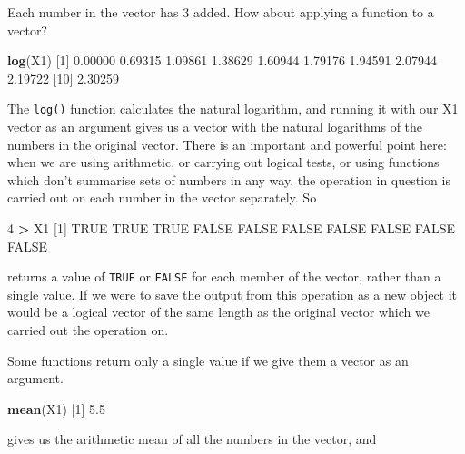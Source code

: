 \documentclass[
]{book}
\newenvironment{Shaded}{\begin{snugshade}}{\end{snugshade}}
\newcommand{\DecValTok}[1]{\textcolor[rgb]{0.00,0.00,0.81}{#1}}
\newcommand{\FloatTok}[1]{\textcolor[rgb]{0.00,0.00,0.81}{#1}}
\newcommand{\KeywordTok}[1]{\textcolor[rgb]{0.13,0.29,0.53}{\textbf{#1}}}
\newcommand{\NormalTok}[1]{#1}
\newcommand{\OperatorTok}[1]{\textcolor[rgb]{0.81,0.36,0.00}{\textbf{#1}}}
\newcommand{\OtherTok}[1]{\textcolor[rgb]{0.56,0.35,0.01}{#1}}
\newcommand{\StringTok}[1]{\textcolor[rgb]{0.31,0.60,0.02}{#1}}
\begin{document}
Each number in the vector has 3 added. How about applying a function to a vector?

\begin{Shaded}
\begin{Highlighting}[]
\KeywordTok{log}\NormalTok{(X1)}
\NormalTok{ [}\DecValTok{1}\NormalTok{] }\FloatTok{0.00000} \FloatTok{0.69315} \FloatTok{1.09861} \FloatTok{1.38629} \FloatTok{1.60944} \FloatTok{1.79176} \FloatTok{1.94591} \FloatTok{2.07944} \FloatTok{2.19722}
\NormalTok{[}\DecValTok{10}\NormalTok{] }\FloatTok{2.30259}
\end{Highlighting}
\end{Shaded}

The \texttt{log()} function calculates the natural logarithm, and running it with our X1 vector as an argument gives us a vector with the natural logarithms of the numbers in the original vector. There is an important and powerful point here: when we are using arithmetic, or carrying out logical tests, or using functions which don't summarise sets of numbers in any way, the operation in question is carried out on each number in the vector separately. So

\begin{Shaded}
\begin{Highlighting}[]
\DecValTok{4} \OperatorTok{>}\StringTok{ }\NormalTok{X1}
\NormalTok{ [}\DecValTok{1}\NormalTok{]  }\OtherTok{TRUE}  \OtherTok{TRUE}  \OtherTok{TRUE} \OtherTok{FALSE} \OtherTok{FALSE} \OtherTok{FALSE} \OtherTok{FALSE} \OtherTok{FALSE} \OtherTok{FALSE} \OtherTok{FALSE}
\end{Highlighting}
\end{Shaded}

returns a value of \texttt{TRUE} or \texttt{FALSE} for each member of the vector, rather than a single value. If we were to save the output from this operation as a new object it would be a logical vector of the same length as the original vector which we carried out the operation on.

Some functions return only a single value if we give them a vector as an argument.

\begin{Shaded}
\begin{Highlighting}[]
\KeywordTok{mean}\NormalTok{(X1)}
\NormalTok{[}\DecValTok{1}\NormalTok{] }\FloatTok{5.5}
\end{Highlighting}
\end{Shaded}

gives us the arithmetic mean of all the numbers in the vector, and
\end{document}

